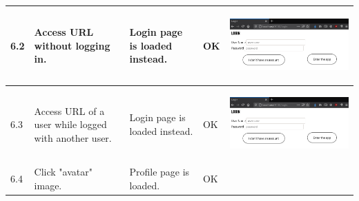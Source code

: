 \documentclass[12pt,twoside,titlepage,a4paper]{article}
\theoremstyle{definicion}
\theoremstyle{lema}
\theoremstyle{teorema}
\theoremstyle{corolario}
\theoremstyle{ejemplo}
\theoremstyle{nota}
\begin{document}
\begin{table}[!h]
\begin{tabular}{|m{0.6cm}|m{2.9cm}|m{3.6cm}|m{1.1cm}|m{5.9cm}|}
		\hline
		6.2 & Access URL without logging in. & Login page is loaded instead. & OK &
		\begin{center}\includegraphics[scale=0.22]{register2-login1.png}\end{center} \\
		\hline
		6.3 & Access URL of a user while logged with another user. & Login page is loaded instead. & OK &
		\begin{center}\includegraphics[scale=0.22]{register2-login1.png}\end{center} \\
		\hline
		6.4 & Click "avatar" image. & Profile page is loaded. & OK &

\end{tabular}
\end{table}
\end{document}

